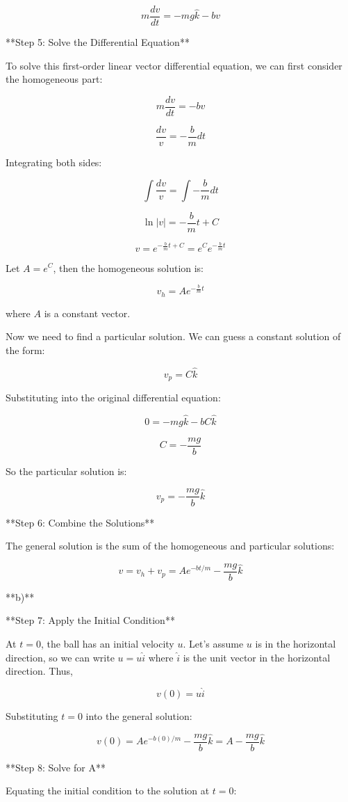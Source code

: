 \documentclass{article}
\begin{document}
$$m\frac{dv}{dt} = -mg\hat{k} - bv$$

**Step 5: Solve the Differential Equation**

To solve this first-order linear vector differential equation, we can first consider the homogeneous part:

$$m\frac{dv}{dt} = -bv$$

$$\frac{dv}{v} = -\frac{b}{m}dt$$

Integrating both sides:

$$\int \frac{dv}{v} = \int -\frac{b}{m}dt$$

$$\ln|v| = -\frac{b}{m}t + C$$

$$v = e^{-\frac{b}{m}t + C} = e^C e^{-\frac{b}{m}t}$$

Let $A = e^C$, then the homogeneous solution is:

$$v_h = Ae^{-\frac{b}{m}t}$$

where $A$ is a constant vector.

Now we need to find a particular solution. We can guess a constant solution of the form:

$$v_p = C\hat{k}$$

Substituting into the original differential equation:

$$0 = -mg\hat{k} - bC\hat{k}$$

$$C = -\frac{mg}{b}$$

So the particular solution is:

$$v_p = -\frac{mg}{b}\hat{k}$$

**Step 6: Combine the Solutions**

The general solution is the sum of the homogeneous and particular solutions:

$$v = v_h + v_p = Ae^{-bt/m} - \frac{mg}{b}\hat{k}$$

**b)**

**Step 7: Apply the Initial Condition**

At $t=0$, the ball has an initial velocity $u$. Let's assume $u$ is in the horizontal direction, so we can write $u = u\hat{i}$ where $\hat{i}$ is the unit vector in the horizontal direction.
Thus,

$$v(0) = u\hat{i}$$

Substituting $t=0$ into the general solution:

$$v(0) = Ae^{-b(0)/m} - \frac{mg}{b}\hat{k} = A - \frac{mg}{b}\hat{k}$$

**Step 8: Solve for A**

Equating the initial condition to the solution at $t=0$:
\end{document}
